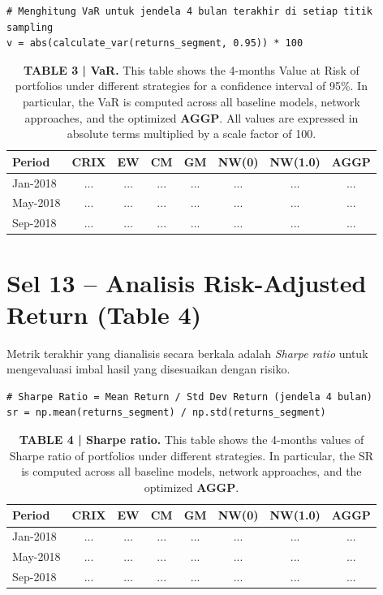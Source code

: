 \documentclass[12pt,a4paper]{article}
\begin{document}
\begin{lstlisting}[caption={Kalkulasi VaR 95\% Periodik}]
# Menghitung VaR untuk jendela 4 bulan terakhir di setiap titik sampling
v = abs(calculate_var(returns_segment, 0.95)) * 100
\end{lstlisting}

\begin{table}[h]
    \centering
    \footnotesize
    \caption{\textbf{TABLE 3 | VaR.} This table shows the 4-months Value at Risk of portfolios under different strategies for a confidence interval of 95\%. In particular, the VaR is computed across all baseline models, network approaches, and the optimized \textbf{AGGP}. All values are expressed in absolute terms multiplied by a scale factor of 100.}
    \begin{tabular}{lccccccc}
        \toprule
        Period & CRIX & EW & CM & GM & NW(0) & NW(1.0) & AGGP \\
        \midrule
        Jan-2018 & ... & ... & ... & ... & ... & ... & ... \\
        May-2018 & ... & ... & ... & ... & ... & ... & ... \\
        Sep-2018 & ... & ... & ... & ... & ... & ... & ... \\
        \bottomrule
    \end{tabular}
\end{table}

\section{Sel 13 -- Analisis Risk-Adjusted Return (Table 4)}
Metrik terakhir yang dianalisis secara berkala adalah \textit{Sharpe ratio} untuk mengevaluasi imbal hasil yang disesuaikan dengan risiko.

\begin{lstlisting}[caption={Kalkulasi Sharpe Ratio Periodik}]
# Sharpe Ratio = Mean Return / Std Dev Return (jendela 4 bulan)
sr = np.mean(returns_segment) / np.std(returns_segment)
\end{lstlisting}

\begin{table}[h]
    \centering
    \footnotesize
    \caption{\textbf{TABLE 4 | Sharpe ratio.} This table shows the 4-months values of Sharpe ratio of portfolios under different strategies. In particular, the SR is computed across all baseline models, network approaches, and the optimized \textbf{AGGP}.}
    \begin{tabular}{lccccccc}
        \toprule
        Period & CRIX & EW & CM & GM & NW(0) & NW(1.0) & AGGP \\
        \midrule
        Jan-2018 & ... & ... & ... & ... & ... & ... & ... \\
        May-2018 & ... & ... & ... & ... & ... & ... & ... \\
        Sep-2018 & ... & ... & ... & ... & ... & ... & ... \\
        \bottomrule
    \end{tabular}
\end{table}
\end{document}
